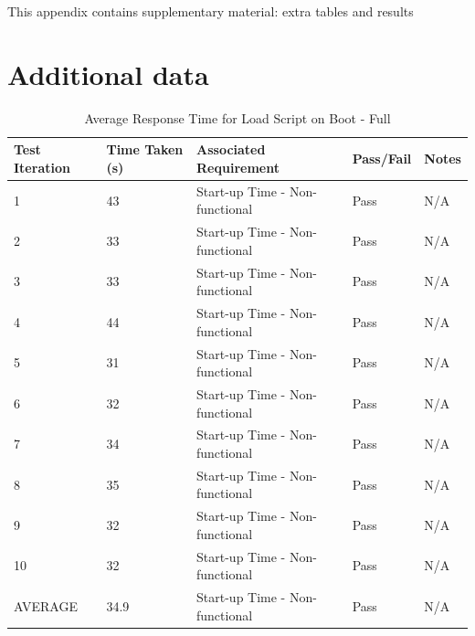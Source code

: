 %

This appendix contains supplementary material: extra tables and results
\section{Additional data}\label{app:data}
\begin{table}[H]
  \centering
  \caption{Average Response Time for Load Script on Boot - Full}
  \label{tab:avgResTimeFullLSB}
  \begin{tabularx}{\linewidth}{XlXlX}
    \toprule
    Test Iteration & Time Taken (s) & Associated Requirement & Pass/Fail & Notes \\
    \midrule
    1 & 43 & Start-up Time - Non-functional & Pass & N/A \\
    2 & 33 & Start-up Time - Non-functional & Pass & N/A \\
    3 & 33 & Start-up Time - Non-functional & Pass & N/A \\
    4 & 44 & Start-up Time - Non-functional & Pass & N/A \\
    5 & 31 & Start-up Time - Non-functional & Pass & N/A \\
    6 & 32 & Start-up Time - Non-functional & Pass & N/A \\
    7 & 34 & Start-up Time - Non-functional & Pass & N/A \\
    8 & 35 & Start-up Time - Non-functional & Pass & N/A \\
    9 & 32 & Start-up Time - Non-functional & Pass & N/A \\
    10 & 32 & Start-up Time - Non-functional & Pass & N/A \\
    \bottomrule
    AVERAGE & 34.9 & Start-up Time - Non-functional & Pass & N/A \\
  \end{tabularx}
\end{table}

